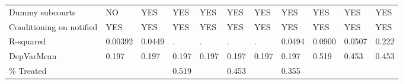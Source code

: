 \begin{tabular}{lrrlrlrlrrr}
Dummy subcourts & \multicolumn{1}{l}{NO} & \multicolumn{1}{l}{YES} & YES   & \multicolumn{1}{l}{YES} & YES   & \multicolumn{1}{l}{YES} & YES   & \multicolumn{1}{l}{YES} & \multicolumn{1}{l}{YES} & \multicolumn{1}{l}{YES} \\
Conditioning on notified & \multicolumn{1}{l}{YES} & \multicolumn{1}{l}{YES} & YES   & \multicolumn{1}{l}{YES} & YES   & \multicolumn{1}{l}{YES} & YES   & \multicolumn{1}{l}{YES} & \multicolumn{1}{l}{YES} & \multicolumn{1}{l}{YES} \\
R-squared & \multicolumn{1}{l}{0.00392} & \multicolumn{1}{l}{0.0449} & .     & \multicolumn{1}{l}{.} & .     & \multicolumn{1}{l}{.} & 0.0494 & \multicolumn{1}{l}{0.0900} & \multicolumn{1}{l}{0.0507} & \multicolumn{1}{l}{0.222} \\
DepVarMean & \multicolumn{1}{l}{0.197} & \multicolumn{1}{l}{0.197} & 0.197 & \multicolumn{1}{l}{0.197} & 0.197 & \multicolumn{1}{l}{0.197} & 0.197 & \multicolumn{1}{l}{0.519} & \multicolumn{1}{l}{0.453} & \multicolumn{1}{l}{0.453} \\
\% Treated &       &       & 0.519 &       & 0.453 &       & 0.355 &       &       &  \\
\bottomrule
\bottomrule
\end{tabular}%
